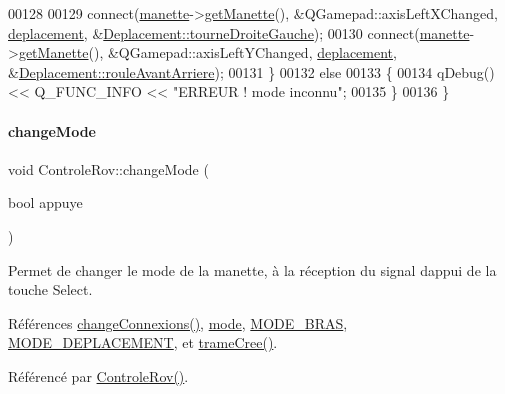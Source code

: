\begin{DoxyCode}
00128 
00129         connect(\hyperlink{class_controle_rov_af5caffd78d06f90d045b53ee87ad76df}{manette}->\hyperlink{class_manette_a708eccb66e967e0fe575b19e9899ff5a}{getManette}(), &QGamepad::axisLeftXChanged, 
      \hyperlink{class_controle_rov_ae96443be0a82814b27958e6ceb0a0acf}{deplacement}, &\hyperlink{class_deplacement_a164cc606a6c5b8d55c1e5475d4d112e0}{Deplacement::tourneDroiteGauche});
00130         connect(\hyperlink{class_controle_rov_af5caffd78d06f90d045b53ee87ad76df}{manette}->\hyperlink{class_manette_a708eccb66e967e0fe575b19e9899ff5a}{getManette}(), &QGamepad::axisLeftYChanged, 
      \hyperlink{class_controle_rov_ae96443be0a82814b27958e6ceb0a0acf}{deplacement}, &\hyperlink{class_deplacement_a65a1c6adfe5114d3cfefa631e0c91618}{Deplacement::rouleAvantArriere});
00131     \}
00132     \textcolor{keywordflow}{else}
00133     \{
00134         qDebug() << Q\_FUNC\_INFO << \textcolor{stringliteral}{"ERREUR ! mode inconnu"};
00135     \}
00136 \}
\end{DoxyCode}
\mbox{\label{class_controle_rov_a206d52adf49b8510316b2885ea6b98b0}} 
\paragraph{\texorpdfstring{change\+Mode}{changeMode}}
{\footnotesize\ttfamily void Controle\+Rov\+::change\+Mode (\begin{DoxyParamCaption}\item[{bool}]{appuye }\end{DoxyParamCaption})\hspace{0.3cm}{\ttfamily [slot]}}

Permet de changer le mode de la manette, à la réception du signal d\textquotesingle{}appui de la touche Select. 

Références \hyperlink{class_controle_rov_a400d5766b9acabb45c1af5f8b22bbe47}{change\+Connexions()}, \hyperlink{class_controle_rov_a5d1fb6ad14da49e3c587199ae86dc28d}{mode}, \hyperlink{controlerov_8h_aa7e25e50c4dd52bfc6abcb3e450686d4}{M\+O\+D\+E\+\_\+\+B\+R\+AS}, \hyperlink{controlerov_8h_a427f99e4fe2f812b0f49a09025623653}{M\+O\+D\+E\+\_\+\+D\+E\+P\+L\+A\+C\+E\+M\+E\+NT}, et \hyperlink{class_controle_rov_a05506e1d8caf632b0394dcffd365c06f}{trame\+Cree()}.



Référencé par \hyperlink{class_controle_rov_acc4d5fea26770217df978d43df2ad51e}{Controle\+Rov()}.


